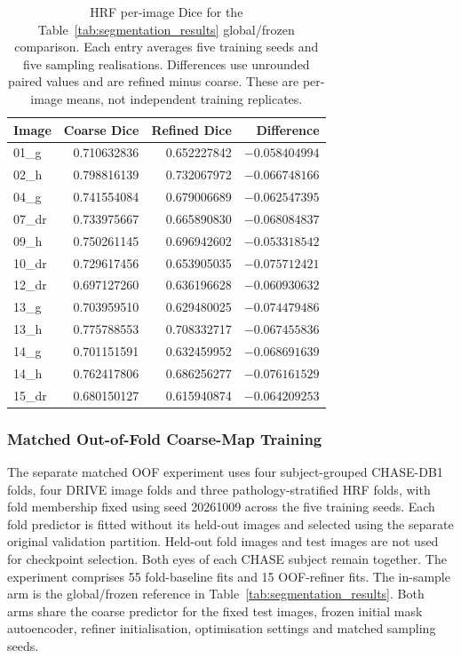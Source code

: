 \documentclass[jimaging,article,submit,pdftex,moreauthors]
  {Definitions/mdpi}
\providecommand{\linelabel}[1]{}
\newcommand{\seclabel}[1]{\linelabel{rev:sec:#1}}
\begin{document}
\begin{table}[htbp]
\centering
\caption{HRF per-image Dice for the Table~\ref{tab:segmentation_results} global/frozen comparison. Each entry averages five training seeds and five sampling realisations. Differences use unrounded paired values and are refined minus coarse. These are per-image means, not independent training replicates.}
\label{tab:paired_per_image_hrf}
\small
\begin{tabular}{lrrr}
\toprule
Image & Coarse Dice & Refined Dice & Difference \\
\midrule
01\_g & 0.710632836 & 0.652227842 & $-0.058404994$ \\
02\_h & 0.798816139 & 0.732067972 & $-0.066748166$ \\
04\_g & 0.741554084 & 0.679006689 & $-0.062547395$ \\
07\_dr & 0.733975667 & 0.665890830 & $-0.068084837$ \\
09\_h & 0.750261145 & 0.696942602 & $-0.053318542$ \\
10\_dr & 0.729617456 & 0.653905035 & $-0.075712421$ \\
12\_dr & 0.697127260 & 0.636196628 & $-0.060930632$ \\
13\_g & 0.703959510 & 0.629480025 & $-0.074479486$ \\
13\_h & 0.775788553 & 0.708332717 & $-0.067455836$ \\
14\_g & 0.701151591 & 0.632459952 & $-0.068691639$ \\
14\_h & 0.762417806 & 0.686256277 & $-0.076161529$ \\
15\_dr & 0.680150127 & 0.615940874 & $-0.064209253$ \\
\bottomrule
\end{tabular}
\end{table}

\FloatBarrier
\subsubsection{Matched Out-of-Fold Coarse-Map Training}
\label{sec:oof}
\seclabel{oof}
The separate matched OOF experiment uses four subject-grouped CHASE-DB1 folds, four DRIVE image folds and three pathology-stratified HRF folds, with fold membership fixed using seed 20261009 across the five training seeds. Each fold predictor is fitted without its held-out images and selected using the separate original validation partition. Held-out fold images and test images are not used for checkpoint selection. Both eyes of each CHASE subject remain together. The experiment comprises 55 fold-baseline fits and 15 OOF-refiner fits. The in-sample arm is the global/frozen reference in Table~\ref{tab:segmentation_results}. Both arms share the coarse predictor for the fixed test images, frozen initial mask autoencoder, refiner initialisation, optimisation settings and matched sampling seeds.
\end{document}
